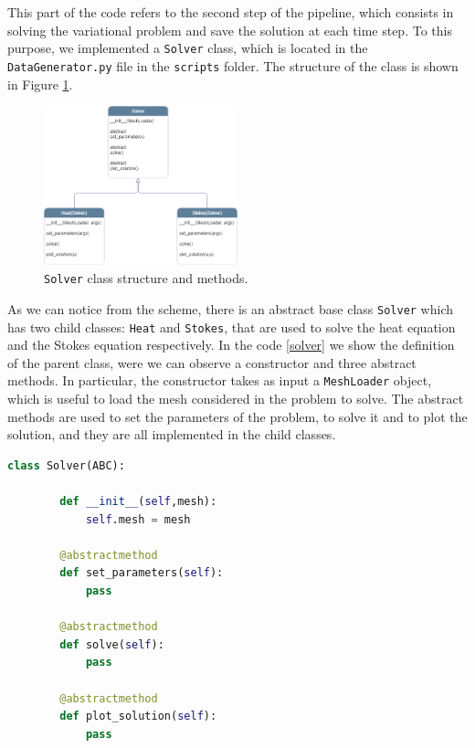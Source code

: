 \documentclass[11pt,a4paper]{article}
\begin{document}
This part of the code refers to the second step of the pipeline, which consists in solving the variational problem and save the solution at each time step.
To this purpose, we implemented a \texttt{Solver} class, which is located in the \texttt{DataGenerator.py} file in the \texttt{scripts} folder. The structure of the class is shown in Figure \ref{solver_class}. 

\begin{figure}[H]
    \centering
    \includegraphics[width=0.5\textwidth]{Images/solver_class.png}
    \caption{\texttt{Solver} class structure and methods.}
    \label{solver_class}
\end{figure}

As we can notice from the scheme, there is an abstract base class \texttt{Solver} which has two child classes: \texttt{Heat} and \texttt{Stokes}, that are used to solve the heat equation and the Stokes equation respectively. 
In the code \ref{solver} we show the definition of the parent class, were we can observe a constructor and three abstract methods. In particular, the constructor takes as input a \texttt{MeshLoader} object, which is useful to load the mesh considered in the problem to solve. The abstract methods are used to set the parameters of the problem, to solve it and to plot the solution, and they are all implemented in the child classes.

\begin{lstlisting}[language=Python, caption={Solver abstract class.}, label={solver}]
    class Solver(ABC):
    
        def __init__(self,mesh):
            self.mesh = mesh

        @abstractmethod 
        def set_parameters(self):
            pass 

        @abstractmethod 
        def solve(self):
            pass 

        @abstractmethod 
        def plot_solution(self):
            pass
\end{lstlisting}
\end{document}
